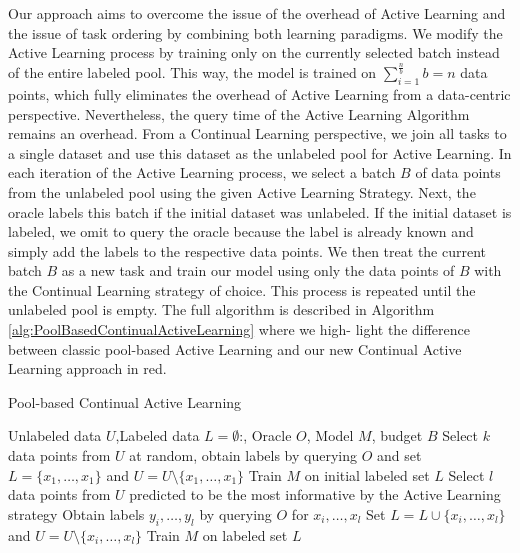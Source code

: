 Our approach aims to overcome the issue of the overhead of Active Learning and the issue of task ordering by combining both learning paradigms. We modify the Active
Learning process by training only on the currently selected batch instead of the entire labeled pool. This way, the model is trained on $\sum_{i=1}^{\frac{n}{b}} b = n$ 
data points, which fully eliminates the overhead of Active Learning from a data-centric perspective. Nevertheless, the query time of the Active Learning Algorithm remains
an overhead. From a Continual Learning perspective, we join all tasks to a single dataset and use this dataset as the unlabeled pool for Active Learning. In each iteration
of the Active Learning process, we select a batch $B$ of data points from the unlabeled pool using the given Active Learning Strategy. Next, the oracle labels this batch
if the initial dataset was unlabeled. If the initial dataset is labeled, we omit to query the oracle because the label is already known and simply add the labels
to the respective data points. We then treat the current batch $B$ as a new task and train our model using only the data points of $B$ with the Continual Learning strategy of
choice. This process is repeated until the unlabeled pool is empty. The full algorithm is described in Algorithm \ref{alg:PoolBasedContinualActiveLearning} where we high-
light the difference between classic pool-based Active Learning and our new Continual Active Learning approach in red. \par

\begin{algorithm}
    \caption{Pool-based Continual Active Learning} \label{alg:PoolBasedContinualActiveLearning}
    \begin{algorithmic}[1]
        \Require Unlabeled data $U$,Labeled data $L = \emptyset$:, Oracle $O$, Model $M$, budget $B$
        \State Select $k$ data points from $U$ at random, obtain labels by querying $O$ and set $L=\{x_1,\ldots,x_1\}$
        and $U = U \setminus \{x_1,\ldots,x_1\}$ 
        \State Train $M$ on initial labeled set $L$
            \State Select $l$ data points from $U$ predicted to be the most informative by the Active Learning strategy
            \State Obtain labels $y_i,\ldots,y_l$ by querying $O$ for $x_i,\ldots,x_l$
            \State Set $L= L \cup \{x_i,\ldots,x_l\}$ and $U = U \setminus \{x_i,\ldots,x_l\}$
            \State Train $M$ on labeled set $L$
        \EndWhile
    \end{algorithmic}
\end{algorithm}

